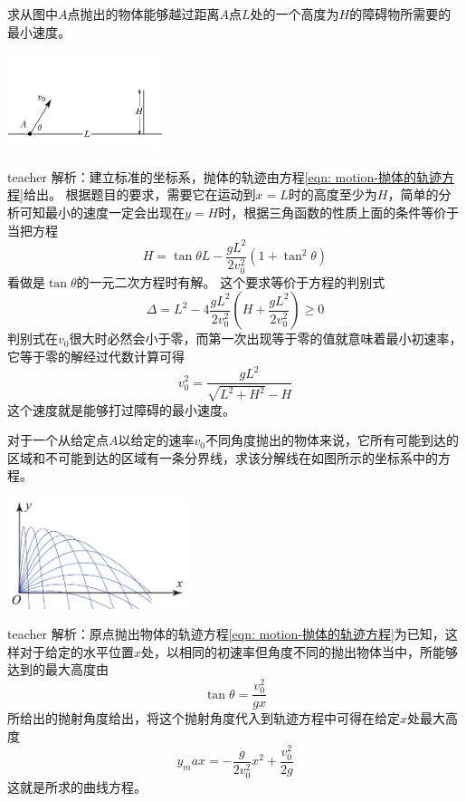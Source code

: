 \begin{example}
求从图中$A$点抛出的物体能够越过距离$A$点$L$处的一个高度为$H$的障碍物所需要的最小速度。
\begin{flushright}
\includegraphics[width=0.34\textwidth]{images/motion-9.pdf} 
\end{flushright}
\begin{taggedblock}{teacher}
\noindent
解析：建立标准的坐标系，抛体的轨迹由方程\ref{eqn: motion-抛体的轨迹方程}给出。
根据题目的要求，需要它在运动到$x=L$时的高度至少为$H$，简单的分析可知最小的速度一定会出现在$y=H$时，根据三角函数的性质上面的条件等价于当把方程
\[
H = \tan\theta L -\frac{gL^2}{2v_0^2}(1+\tan^2\theta)
\]
看做是$\tan\theta$的一元二次方程时有解。
这个要求等价于方程的判别式
\[
\Delta  = L^2 - 4\frac{gL^2}{2v_0^2}(H+\frac{gL^2}{2v_0^2})\geq 0
\]
判别式在$v_0$很大时必然会小于零，而第一次出现等于零的值就意味着最小初速率，它等于零的解经过代数计算可得
\[
v_0^2 = \frac{gL^2}{\sqrt{L^2+H^2}-H}
\]
这个速度就是能够打过障碍的最小速度。
\end{taggedblock}
\end{example}


\begin{example}
对于一个从给定点$A$以给定的速率$v_0$不同角度抛出的物体来说，它所有可能到达的区域和不可能到达的区域有一条分界线，求该分解线在如图所示的坐标系中的方程。
\begin{flushright}
\includegraphics[width = 0.4\textwidth]{images/motion-34.pdf} 
\end{flushright}
\begin{taggedblock}{teacher}
\noindent
解析：原点抛出物体的轨迹方程\ref{eqn: motion-抛体的轨迹方程}为已知，这样对于给定的水平位置$x$处，以相同的初速率但角度不同的抛出物体当中，所能够达到的最大高度由
\[
\tan\theta = \frac{v_0^2}{gx}
\]
所给出的抛射角度给出，将这个抛射角度代入到轨迹方程中可得在给定$x$处最大高度
\[
y_max = -\frac{g}{2v_0^2}x^2+\frac{v_0^2}{2g}
\]
这就是所求的曲线方程。
\end{taggedblock}
\end{example}


